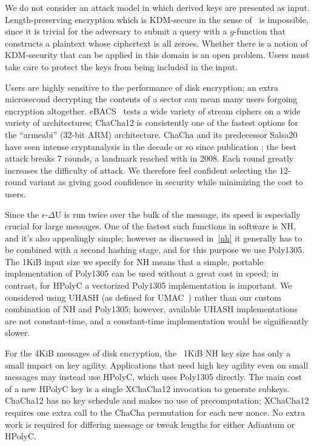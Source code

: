 \documentclass[eprint.tex]{subfiles}
\begin{document}
We do not consider an attack model in which derived keys are presented as input.
Length-preserving encryption
which is KDM-secure in the sense of~\cite{kdm} is impossible, since it is trivial for the
adversary to submit a query with a $g$-function
that constructs a plaintext whose ciphertext is all zeroes.
Whether there is a notion of KDM-security that can be
applied in this domain is an open problem. Users must take care to protect the keys from being
included in the input.

Users are highly sensitive to the performance of disk encryption; an
extra microsecond decrypting the contents of a sector can mean many users
forgoing encryption altogether.
eBACS~\cite{supercop} tests a wide variety of stream ciphers on a wide variety
of architectures; ChaCha12 is consistently one of the
fastest options for the ``armeabi'' (32-bit ARM) architecture.
ChaCha and its predecessor Salsa20
have seen intense cryptanalysis in the decade or so since publication
\cite{tdcs20,nonrandomsalsa,tsunoo,latindance,ishiguro2011,ishiguro2012,zhenqing2012,
maitra2015,chachamaitra,choudhuri2016,dey2017,Choudhuri_Maitra_2017,chacha2018};
the best attack breaks 7 rounds, a landmark reached with \cite{latindance} in 2008.
Each round greatly increases the difficulty of attack.
We therefore feel confident selecting the 12-round variant as giving
good confidence in security while minimizing the cost to users.

Since the $\epsilon$-$\Delta$U is run twice over the bulk of the message, its speed is especially
crucial for large messages. One of the fastest such functions in software is NH, and
it's also appealingly simple; however as discussed in~\autoref{nh} it generally has to be
combined with a second hashing stage, and for this purpose we use Poly1305. The 1KiB input size
we specify for NH means that a simple, portable implementation of Poly1305 can be
used without a great cost in speed; in contrast, for HPolyC a vectorized
Poly1305 implementation is important.
We considered using UHASH (as defined for UMAC~\cite{rfc4418}) rather than our
custom combination of NH and Poly1305; however, available UHASH implementations
are not constant-time, and a constant-time implementation would be significantly
slower.

For the 4KiB messages of disk encryption,
the ~1KiB NH key size has only a small impact on key agility. Applications
that need high key agility even on small messages may instead use HPolyC, which
uses Poly1305 directly. The main
cost of a new HPolyC key is a single XChaCha12 invocation to generate subkeys.
ChaCha12 has no key schedule
and makes no use of precomputation; XChaCha12
requires one extra call to the ChaCha permutation for each new nonce.
No extra work is required for differing message or tweak lengths for either Adiantum
or HPolyC.
\end{document}
